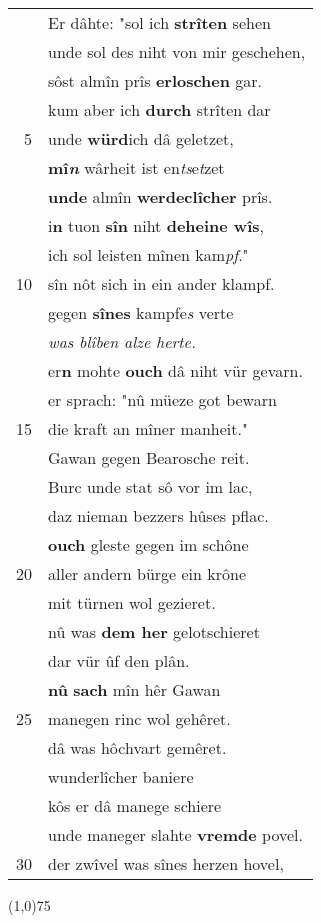 \documentclass[8pt,a4paper,notitlepage]{article}
\begin{document}
\begin{table}[ht]
\begin{minipage}[t]{0.5\linewidth}
\begin{tabular}{rl}
 & Er dâhte: "sol ich \textbf{strîten} sehen\\ 
 & unde sol des niht von mir geschehen,\\ 
 & sôst almîn prîs \textbf{erloschen} gar.\\ 
 & kum aber ich \textbf{durch} strîten dar\\ 
5 & unde \textbf{würd}ich dâ geletzet,\\ 
 & \textbf{mî\textit{n}} wârheit ist en\textit{ts}e\textit{t}zet\\ 
 & \textbf{unde} almîn \textbf{werdeclîcher} prîs.\\ 
 & i\textbf{n} tuon \textbf{sîn} niht \textbf{deheine wîs},\\ 
 & ich sol leisten mînen kam\textit{pf}."\\ 
10 & sîn nôt sich in ein ander klampf.\\ 
 & gegen \textbf{sînes} kampfe\textit{s} verte\\ 
 & \textit{was blîben alze herte.}\\ 
 & er\textbf{n} mohte \textbf{ouch} dâ niht vür gevarn.\\ 
 & er sprach: "nû müeze got bewarn\\ 
15 & die kraft an mîner manheit."\\ 
 & Gawan gegen Bearosche reit.\\ 
 & Burc unde stat sô vor im lac,\\ 
 & daz nieman bezzers hûses pflac.\\ 
 & \textbf{ouch} gleste gegen im schône\\ 
20 & aller andern bürge ein krône\\ 
 & mit türnen wol gezieret.\\ 
 & nû was \textbf{dem her} gelotschieret\\ 
 & dar vür ûf den plân.\\ 
 & \textbf{nû} \textbf{sach} mîn hêr Gawan\\ 
25 & manegen rinc wol gehêret.\\ 
 & dâ was hôchvart gemêret.\\ 
 & wunderlîcher baniere\\ 
 & kôs er dâ manege schiere\\ 
 & unde maneger slahte \textbf{vremde} povel.\\ 
30 & der zwîvel was sînes herzen hovel,\\ 
\end{tabular}
\scriptsize
\line(1,0){75} \newline

\end{minipage}
\end{table}
\end{document}

